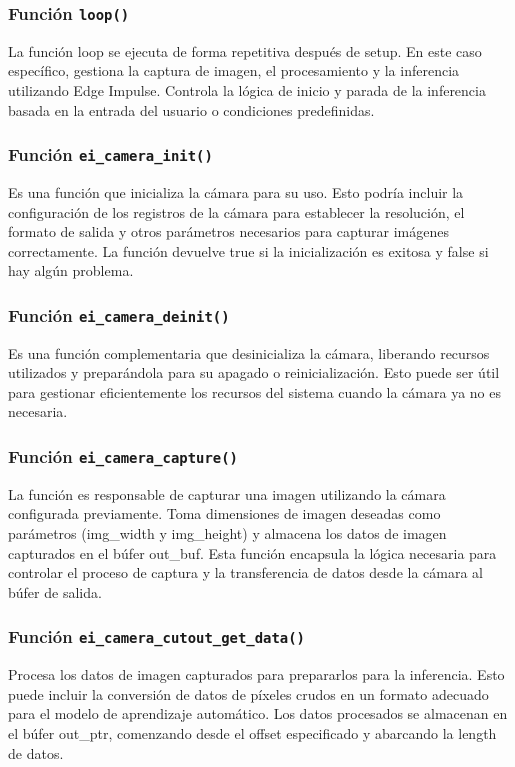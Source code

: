 \subsubsection{Función \texttt{loop()}}
La función loop se ejecuta de forma repetitiva después de setup. En este caso específico, gestiona la captura de imagen, el procesamiento y la inferencia utilizando Edge Impulse. Controla la lógica de inicio y parada de la inferencia basada en la entrada del usuario o condiciones predefinidas.

\subsubsection{Función \texttt{ei\_camera\_init()}}
Es una función que inicializa la cámara para su uso. Esto podría incluir la configuración de los registros de la cámara para establecer la resolución, el formato de salida y otros parámetros necesarios para capturar imágenes correctamente. La función devuelve true si la inicialización es exitosa y false si hay algún problema.

\subsubsection{Función \texttt{ei\_camera\_deinit()}}
Es una función complementaria que desinicializa la cámara, liberando recursos utilizados y preparándola para su apagado o reinicialización. Esto puede ser útil para gestionar eficientemente los recursos del sistema cuando la cámara ya no es necesaria.

\subsubsection{Función \texttt{ei\_camera\_capture()}}
La función es responsable de capturar una imagen utilizando la cámara configurada previamente. Toma dimensiones de imagen deseadas como parámetros (img\_width y img\_height) y almacena los datos de imagen capturados en el búfer out\_buf. Esta función encapsula la lógica necesaria para controlar el proceso de captura y la transferencia de datos desde la cámara al búfer de salida.

\subsubsection{Función \texttt{ei\_camera\_cutout\_get\_data()}}
Procesa los datos de imagen capturados para prepararlos para la inferencia. Esto puede incluir la conversión de datos de píxeles crudos en un formato adecuado para el modelo de aprendizaje automático. Los datos procesados se almacenan en el búfer out\_ptr, comenzando desde el offset especificado y abarcando la length de datos.

